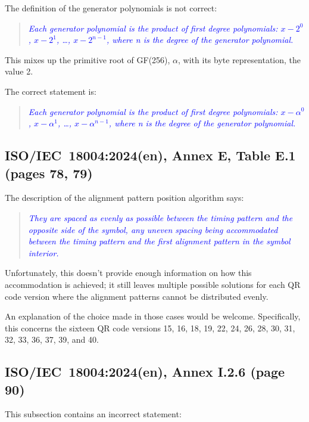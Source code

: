 \documentclass[a4paper,twoside]{article}
\newcommand{\shortstandard}{ISO/IEC~18004}
\newcommand{\standard}{\shortstandard:2024(en)}
\newcommand{\quotestandard}[1]{\textcolor{blue}{\textit{#1}}}
\newcommand{\change}[1]{\underline{\textbf{#1}}}
\begin{document}
The definition of the generator polynomials is not correct:

\begin{quote}
\quotestandard{Each generator polynomial is the product of first degree polynomials: $x - 2^0$, $x - 2^1$, \dots, $x - 2^{n-1}$,
where n is the degree of the generator polynomial.}
\end{quote}

This mixes up the primitive root of GF(256), $\alpha$, with its byte representation, the value 2.

The correct statement is:

\begin{quote}
\quotestandard{Each generator polynomial is the product of first degree polynomials: \change{$x - \alpha^0$}, \change{$x - \alpha^1$}, \dots, \change{$x - \alpha^{n-1}$},
where n is the degree of the generator polynomial.}
\end{quote}

\subsection{\standard, Annex E, Table E.1 (pages 78, 79)}

The description of the alignment pattern position algorithm says:

\begin{quote}
\quotestandard{They are spaced as evenly as possible between the timing pattern and the opposite side of the symbol, any uneven
spacing being accommodated between the timing pattern and the first alignment pattern in the symbol interior.}
\end{quote}

Unfortunately, this doesn't provide enough information on how this accommodation is achieved; it still leaves multiple
possible solutions for each QR code version where the alignment patterns cannot be distributed evenly.

An explanation  of the choice made in those cases would be welcome. Specifically, this concerns the sixteen QR code versions
15, 16, 18, 19, 22, 24, 26, 28, 30, 31, 32, 33, 36, 37, 39, and 40.

\subsection{\standard, Annex I.2.6 (page 90)}
\label{sec:dmp-changed-2}

This subsection contains an incorrect statement:
\end{document}
